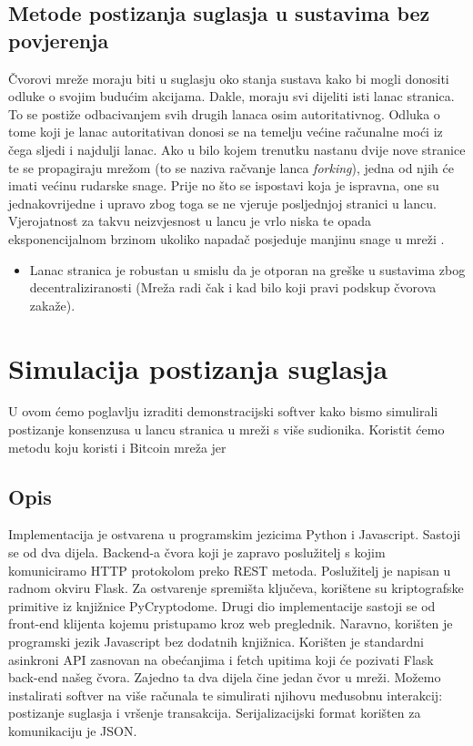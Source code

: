 \documentclass[utf8, zavrsni]{fer}
\begin{document}
\section{Metode postizanja suglasja u sustavima bez povjerenja}
Čvorovi mreže moraju biti u suglasju oko stanja sustava kako bi mogli donositi odluke o svojim budućim akcijama. Dakle, moraju svi dijeliti isti lanac stranica. To se postiže odbacivanjem svih drugih lanaca osim autoritativnog. Odluka o tome koji je lanac autoritativan donosi se na temelju većine računalne moći iz čega sljedi i najdulji lanac. Ako u bilo kojem trenutku nastanu dvije nove stranice te se propagiraju mrežom (to se naziva račvanje lanca \textit{forking}), jedna od njih će imati većinu rudarske snage. Prije no što se ispostavi koja je ispravna, one su jednakovrijedne i upravo zbog toga se ne vjeruje posljednjoj stranici u lancu. Vjerojatnost za takvu neizvjesnost u lancu je vrlo niska te opada eksponencijalnom brzinom ukoliko napadač posjeduje manjinu snage u mreži \cite{btc, satoshi}.
\begin{itemize}
	\item Lanac stranica je robustan u smislu da je otporan na greške u sustavima zbog decentraliziranosti (Mreža radi čak i kad bilo koji pravi podskup čvorova zakaže).
\end{itemize}

\chapter{Simulacija postizanja suglasja}

U ovom ćemo poglavlju izraditi demonstracijski softver kako bismo simulirali postizanje konsenzusa u lancu stranica u mreži s više sudionika. Koristit ćemo metodu koju koristi i Bitcoin mreža jer 

\section{Opis}
Implementacija je ostvarena u programskim jezicima Python i Javascript. Sastoji se od dva dijela. Backend-a čvora koji je zapravo poslužitelj s kojim komuniciramo HTTP protokolom preko REST metoda. Poslužitelj je napisan u radnom okviru Flask. Za ostvarenje spremišta ključeva, korištene su kriptografske primitive iz knjižnice PyCryptodome. Drugi dio implementacije sastoji se od front-end klijenta kojemu pristupamo kroz web preglednik. Naravno, korišten je programski jezik Javascript bez dodatnih knjižnica. Korišten je standardni asinkroni API zasnovan na obećanjima i fetch upitima koji će pozivati Flask back-end našeg čvora. Zajedno ta dva dijela čine jedan čvor u mreži. Možemo instalirati softver na više računala te simulirati njihovu međusobnu interakcij: postizanje suglasja i vršenje transakcija. Serijalizacijski format korišten za komunikaciju je JSON.
\end{document}
